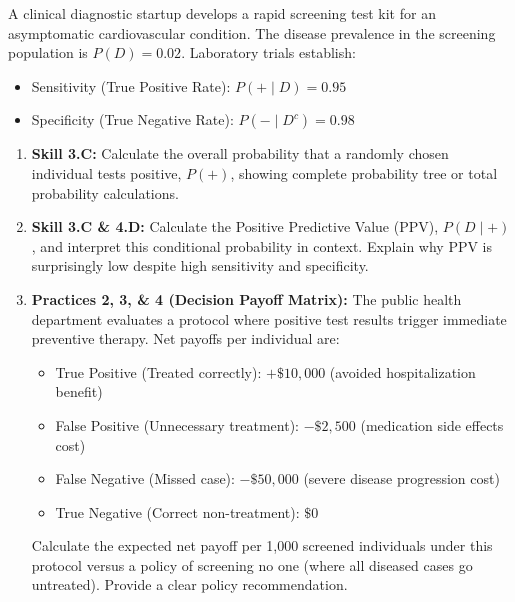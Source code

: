 \begin{workbookbox}
A clinical diagnostic startup develops a rapid screening test kit for an asymptomatic cardiovascular condition. The disease prevalence in the screening population is $P(D) = 0.02$. Laboratory trials establish:
\begin{itemize}
  \item Sensitivity (True Positive Rate): $P(+ \mid D) = 0.95$
  \item Specificity (True Negative Rate): $P(- \mid D^c) = 0.98$
\end{itemize}
\begin{enumerate}[label=(\alph*)]
  \item \textbf{Skill 3.C:} Calculate the overall probability that a randomly chosen individual tests positive, $P(+)$, showing complete probability tree or total probability calculations.
  \item \textbf{Skill 3.C \& 4.D:} Calculate the Positive Predictive Value (PPV), $P(D \mid +)$, and interpret this conditional probability in context. Explain why PPV is surprisingly low despite high sensitivity and specificity.
  \item \textbf{Practices 2, 3, \& 4 (Decision Payoff Matrix):} The public health department evaluates a protocol where positive test results trigger immediate preventive therapy. Net payoffs per individual are:
  \begin{itemize}
    \item True Positive (Treated correctly): $+\$10,000$ (avoided hospitalization benefit)
    \item False Positive (Unnecessary treatment): $-\$2,500$ (medication side effects cost)
    \item False Negative (Missed case): $-\$50,000$ (severe disease progression cost)
    \item True Negative (Correct non-treatment): $\$0$
  \end{itemize}
  Calculate the expected net payoff per 1,000 screened individuals under this protocol versus a policy of screening no one (where all diseased cases go untreated). Provide a clear policy recommendation.
\end{enumerate}
\end{workbookbox}